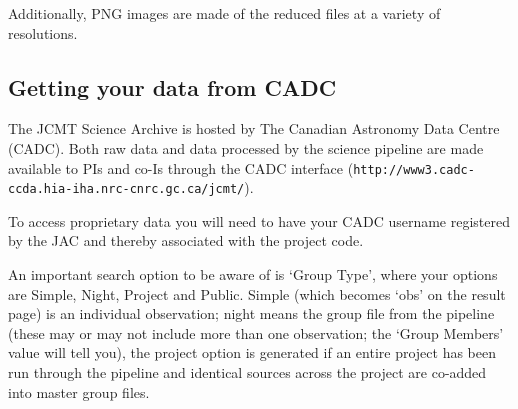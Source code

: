 \documentclass[twoside,11pt]{article}
\newcommand{\xlabel}[1]{}
\renewcommand{\_}{\texttt{\symbol{95}}}
\begin{document}
Additionally, PNG images are made of the reduced files at a variety of
resolutions.

\subsection{\xlabel{cadc}Getting your data from CADC}

The JCMT Science Archive is hosted by The Canadian Astronomy Data
Centre (CADC). Both raw data and data processed by the science pipeline
are made available to PIs and co-Is through the CADC interface
(\texttt{http://www3.cadc-ccda.hia-iha.nrc-cnrc.gc.ca/jcmt/}).

To access proprietary data you will need to have your CADC username
registered by the JAC and thereby associated with the project code.

An important search option to be aware of is `Group Type', where your
options are Simple, Night, Project and Public. Simple (which becomes
`obs' on the result page) is an individual observation; night means
the group file from the pipeline (these may or may not include more
than one observation; the `Group Members' value will tell you), the
project option is generated if an entire project has been run through
the pipeline and identical sources across the project are co-added
into master group files.

\clearpage
\end{document}
